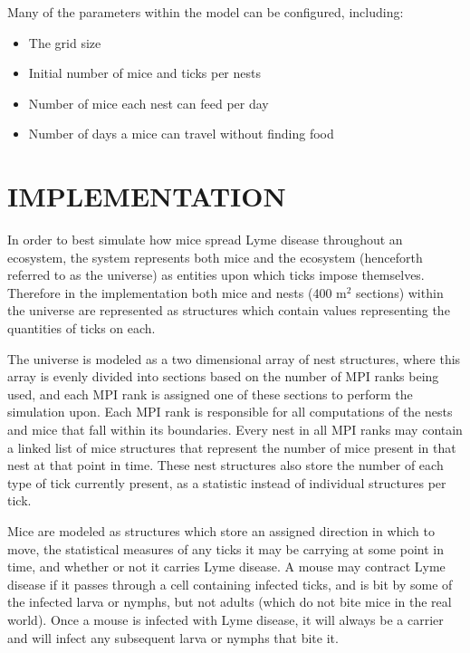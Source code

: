 \documentclass[letterpaper, 10 pt, conference]{ieeeconf}  %
\begin{document}
Many of the parameters within the model can be configured, including:
\begin{itemize}
\item The grid size
\item Initial number of mice and ticks per nests
\item Number of mice each nest can feed per day
\item Number of days a mice can travel without finding food
\end{itemize}

\bigskip
\section{IMPLEMENTATION}
In order to best simulate how mice spread Lyme disease throughout an ecosystem, the system represents both mice and the ecosystem (henceforth referred to as the \textquotesingle universe\textquotesingle) as entities upon which ticks impose themselves.  Therefore in the implementation both mice and nests (400 m$^2$ sections) within the universe are represented as structures which contain values representing the quantities of ticks on each.
	
The universe is modeled as a two dimensional array of nest structures, where this array is evenly divided into sections based on the number of MPI ranks being used, and each MPI rank is assigned one of these sections to perform the simulation upon.  Each MPI rank is responsible for all computations of the nests and mice that fall within its boundaries.  Every nest in all MPI ranks may contain a linked list of mice structures that represent the number of mice present in that nest at that point in time.  These nest structures also store the number of each type of tick currently present, as a statistic instead of individual structures per tick.  

Mice are modeled as structures which store an assigned direction in which to move, the statistical measures of any ticks it may be carrying at some point in time, and whether or not it carries Lyme disease.  A mouse may contract Lyme disease if it passes through a cell containing infected ticks, and is bit by some of the infected larva or nymphs, but not adults (which do not bite mice in the real world).  Once a mouse is infected with Lyme disease, it will always be a carrier and will infect any subsequent larva or nymphs that bite it.  
\end{document}
